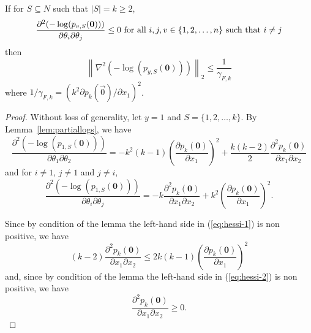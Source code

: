 \begin{lemma} If for $S\subseteq N$ such that $|S| =k \geq 2$,
$$
\frac{\partial^2 (-\log(p_{v,S}(\vec{0})))}{\partial \theta_i\partial \theta_j} \leq 0 \hbox{ for all } i,j,v\in \{1,2,\ldots,n\} \hbox{ such that } i\neq j
$$
then
$$
\left\| \nabla^2(-\log(p_{y,S} ({\bm 0}))) \right\|_2 \le \frac{1}{\gamma_{F,k}}
$$
where $1/\gamma_{F,k} = \left(k^2 \partial p_k(\vec{0})/\partial x_1\right)^2$.
\label{lem:hessian-p2}
\end{lemma}

\begin{proof} Without loss of generality, let $y=1$ and $S = \{1,2,\dots,k \}$. By Lemma~\ref{lem:partiallogs}, we have
\begin{equation}
\frac{\partial^2(-\log(p_{1,S} ({\bm 0})))}{\partial \theta_1 \partial \theta_2} 
= - k^2(k-1)\left( \frac{\partial p_k({\bm 0})}{\partial x_1}\right)^2
 + \frac{k(k-2)}{2}\frac{\partial^2 p_k({\bm 0})}{\partial x_1 \partial x_2} 
\label{eq:hessi-1}
\end{equation}
and for $i\neq 1$, $j\neq 1$ and $j\neq i$,
\begin{equation}
\frac{\partial^2 (-\log(p_{1,S} ({\bm 0})))}{\partial \theta_i \partial \theta_j} = -k \frac{\partial^2 p_k({\bm 0})}{\partial x_1 \partial x_2}
+ k^2\left(\frac{\partial p_k({\bm 0})}{\partial x_1}\right)^2. 
\label{eq:hessi-2}
\end{equation}

Since by condition of the lemma the left-hand side in (\ref{eq:hessi-1}) is non positive, we have 
\begin{equation}
(k-2)\frac{\partial^2 p_k({\bm 0})}{\partial x_1 \partial x_2} \le 2k(k-1) \left( \frac{\partial p_k({\bm 0})}{\partial x_1}\right)^2
\label{eq:hessi-3}
\end{equation}
and, since by condition of the lemma the left-hand side in (\ref{eq:hessi-2}) is non positive, we have 
\begin{equation}
\frac{\partial^2 p_k({\bm 0})}{\partial x_1 \partial x_2}\ge 0.
\label{eq:hessi-4}
\end{equation} 


\end{proof}
